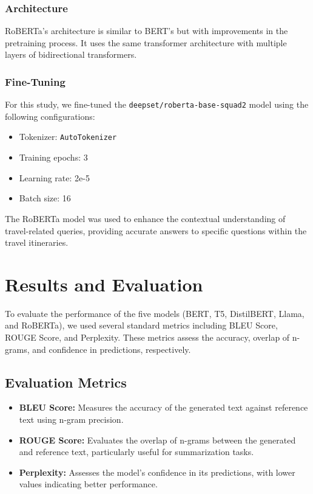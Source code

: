 \documentclass[conference]{IEEEtran}
\begin{document}
\subsubsection{Architecture}
RoBERTa's architecture is similar to BERT's but with improvements in the pretraining process. It uses the same transformer architecture with multiple layers of bidirectional transformers.

\subsubsection{Fine-Tuning}
For this study, we fine-tuned the \texttt{deepset/roberta-base-squad2} model using the following configurations:
\begin{itemize}
    \item Tokenizer: \texttt{AutoTokenizer}
    \item Training epochs: 3
    \item Learning rate: 2e-5
    \item Batch size: 16
\end{itemize}

The RoBERTa model was used to enhance the contextual understanding of travel-related queries, providing accurate answers to specific questions within the travel itineraries.

\section{Results and Evaluation}

To evaluate the performance of the five models (BERT, T5, DistilBERT, Llama, and RoBERTa), we used several standard metrics including BLEU Score, ROUGE Score, and Perplexity. These metrics assess the accuracy, overlap of n-grams, and confidence in predictions, respectively.

\subsection{Evaluation Metrics}

\begin{itemize}
    \item \textbf{BLEU Score:} Measures the accuracy of the generated text against reference text using n-gram precision.
    \item \textbf{ROUGE Score:} Evaluates the overlap of n-grams between the generated and reference text, particularly useful for summarization tasks.
    \item \textbf{Perplexity:} Assesses the model's confidence in its predictions, with lower values indicating better performance.
\end{itemize}
\end{document}

